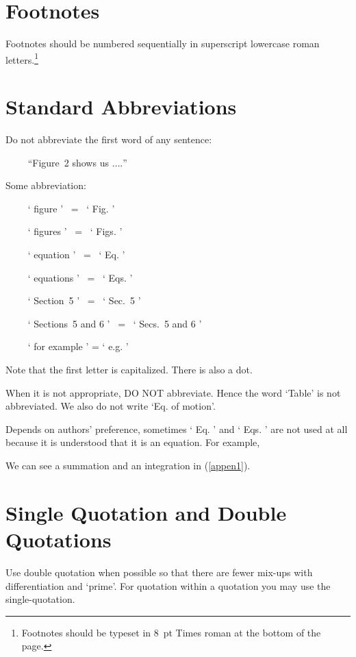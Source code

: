 \documentclass{ws-rv9x6}
\begin{document}
\section{Footnotes}
Footnotes should be numbered sequentially in superscript lowercase
roman letters.\footnote{Footnotes should be typeset in 8~pt Times
roman at the bottom of the page.}

\section{Standard Abbreviations}
\begin{alphlist}[(d)]
\item Do not abbreviate the first word of any sentence: 

$ \qquad $ ``Figure~2 shows us $\ldots.$''

\item Some abbreviation:

$ \qquad $ ` figure ' $ \, $ = $ \, $  ` Fig. '

$ \qquad $ ` figures ' $ \, $ = $ \, $ ` Figs. '

$ \qquad $ ` equation ' $ \, $ = $ \, $ ` Eq. '

$ \qquad $ ` equations ' $ \, $ = $ \, $ ` Eqs. '

$ \qquad $ ` Section~5 ' $ \, $ = $ \, $ ` Sec.~5 '

$ \qquad $ ` Sections~5 and 6 ' $ \, $ = $ \, $ ` Secs.~5 and 6 '

$ \qquad $ ` for example ' = ` e.g. '

\noindent
Note that the first letter is capitalized. There is also a dot. 

\item When it is not appropriate, DO NOT abbreviate. Hence the word `Table'
is not abbreviated. We also do not write `Eq. of motion'.

\item Depends on authors' preference, sometimes ` Eq. ' and ` Eqs. '
are not used at all because it is understood that it is an equation.
For example,  

\begin{center}
We can see a summation and an integration in (\ref{appen1}).
\end{center}
\end{alphlist}

\section{Single Quotation and Double Quotations}
Use double quotation when possible so that there are fewer mix-ups with
differentiation and `prime'. For quotation within a 
quotation you may use the single-quotation.
\end{document}
